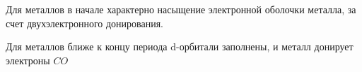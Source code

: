 Для металлов в начале характерно насыщение электронной оболочки металла, за счет двухэлектронного донирования.

Для металлов ближе к концу периода d-орбитали заполнены, и металл донирует электроны $CO$















